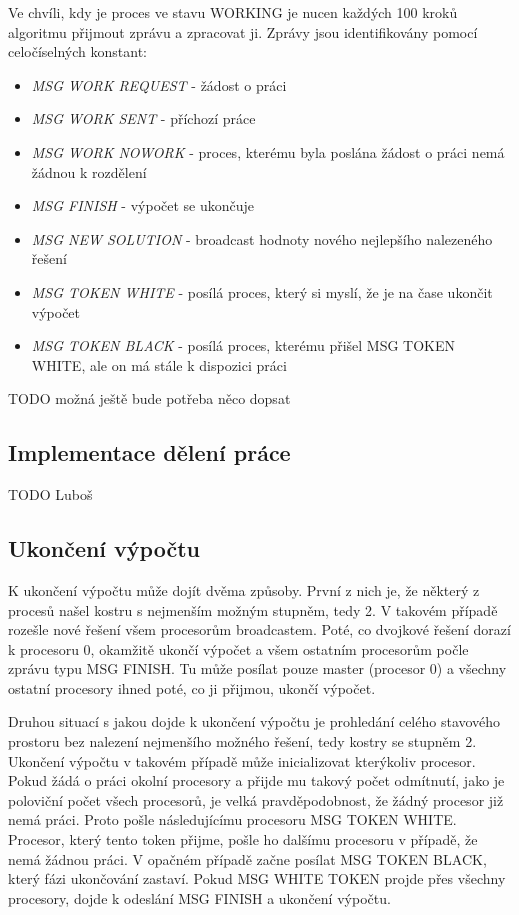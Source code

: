\documentclass[]{article}
\begin{document}
Ve chvíli, kdy je proces ve stavu WORKING je nucen každých 100 kroků algoritmu přijmout zprávu a zpracovat ji. Zprávy jsou identifikovány pomocí celočíselných konstant:

\begin{itemize}
  \item \textit{MSG WORK REQUEST} - žádost o práci
  \item \textit{MSG WORK SENT} - příchozí práce
  \item \textit{MSG WORK NOWORK} - proces, kterému byla poslána žádost o práci nemá žádnou k rozdělení
  \item \textit{MSG FINISH} - výpočet se ukončuje
  \item \textit{MSG NEW SOLUTION} - broadcast hodnoty nového nejlepšího nalezeného řešení
  \item \textit{MSG TOKEN WHITE} - posílá proces, který si myslí, že je na čase ukončit výpočet
  \item \textit{MSG TOKEN BLACK } - posílá proces, kterému přišel MSG TOKEN WHITE, ale on má stále k dispozici práci
\end{itemize}

TODO možná ještě bude potřeba něco dopsat

\subsection{Implementace dělení práce}

TODO Luboš

\subsection{Ukončení výpočtu}

K ukončení výpočtu může dojít dvěma způsoby. První z nich je, že některý z procesů našel kostru s nejmenším možným stupněm, tedy 2. V takovém případě rozešle nové řešení všem procesorům broadcastem. Poté, co dvojkové řešení dorazí k procesoru 0, okamžitě ukončí výpočet a všem ostatním procesorům počle zprávu typu MSG FINISH. Tu může posílat pouze master (procesor 0) a všechny ostatní procesory ihned poté, co ji přijmou, ukončí výpočet.

Druhou situací s jakou dojde k ukončení výpočtu je prohledání celého stavového prostoru bez nalezení nejmenšího možného řešení, tedy kostry se stupněm 2. Ukončení výpočtu v takovém případě může inicializovat kterýkoliv procesor. Pokud žádá o práci okolní procesory a přijde mu takový počet odmítnutí, jako je poloviční počet všech procesorů, je velká pravděpodobnost, že žádný procesor již nemá práci. Proto pošle následujícímu procesoru MSG TOKEN WHITE. Procesor, který tento token přijme, pošle ho dalšímu procesoru v případě, že nemá žádnou práci. V opačném případě začne posílat MSG TOKEN BLACK, který fázi ukončování zastaví. Pokud MSG WHITE TOKEN projde přes všechny procesory, dojde k odeslání MSG FINISH a ukončení výpočtu.
\end{document}

